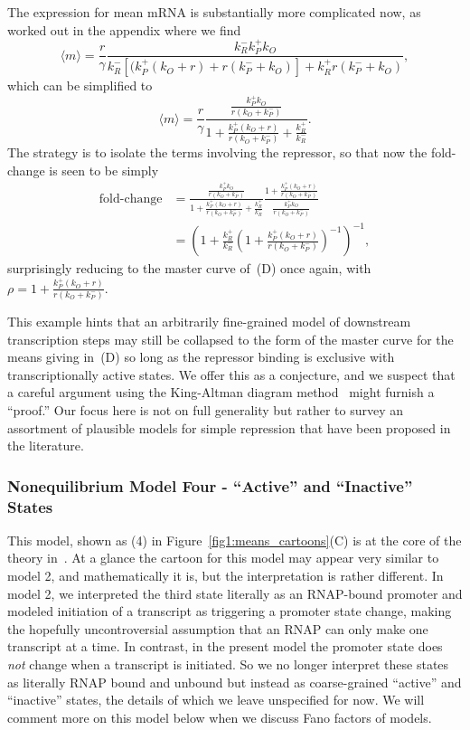 The expression for mean mRNA is substantially more complicated now, as worked
out in the appendix  where we find
\begin{equation}
\langle m\rangle = \frac{r}{\gamma}
        \frac{k_R^- k_P^+ k_O}
        {k_R^- [(k_P^+ (k_O + r) + r(k_P^- + k_O)] + k_R^+ r(k_P^- + k_O)},
\end{equation}
which can be simplified to
\begin{equation}
\langle m\rangle
= \frac{r}{\gamma}
\frac{\frac{k_P^+ k_O}{r(k_O + k_P^-)}}
        {1 + \frac{k_P^+ (k_O + r)}{r(k_O + k_P^-)} + \frac{k_R^+}{k_R^-}}.
\end{equation}
The strategy is to isolate the terms involving the repressor, so that now the
fold-change is seen to be simply
\begin{align}
\text{fold-change}
&= \frac{\frac{k_P^+ k_O}{r(k_O + k_P^-)}}
        {1 + \frac{k_P^+ (k_O + r)}{r(k_O + k_P^-)} + \frac{k_R^+}{k_R^-}}
        \frac{1 + \frac{k_P^+ (k_O + r)}{r(k_O + k_P^-)}}
                {\frac{k_P^+ k_O}{r(k_O + k_P^-)}}
\\
&= \left(
        1 + \frac{k_R^+}{k_R^-}
        \left(1 + \frac{k_P^+ (k_O + r)}{r(k_O + k_P^-)}\right)^{-1}
\right)^{-1},
\end{align}
surprisingly reducing to the master curve of~(D) once
again, with $\rho = 1 + \frac{k_P^+ (k_O + r)}{r(k_O + k_P^-)}$.

This example hints that an arbitrarily fine-grained model of downstream
transcription steps may still be collapsed to the form of the master curve for
the means giving in~(D) so long as the repressor
binding is exclusive with transcriptionally active states. We offer this as a
conjecture, and we suspect that a careful argument using the King-Altman diagram
method~\cite{King1956, Hill1966} might furnish a ``proof.'' Our focus here is
not on full generality but rather to survey an assortment of plausible models
for simple repression  that have been proposed in the literature.

\subsubsection{Nonequilibrium Model Four - ``Active'' and ``Inactive'' States}
This model, shown as (4) in Figure~\ref{fig1:means_cartoons}(C) is at the core
of the theory in~\cite{Razo-Mejia2020}. At a glance the cartoon for this model
may appear very similar to model 2, and mathematically it is, but the
interpretation is rather different. In model 2, we interpreted the third state
literally as an RNAP-bound promoter and modeled initiation of a transcript as
triggering a promoter state change, making the hopefully uncontroversial
assumption that an RNAP can only make one transcript at a time. In contrast, in
the present model the promoter state does \textit{not} change when a transcript
is initiated. So we no longer interpret these states as literally RNAP bound and
unbound but instead as coarse-grained ``active'' and ``inactive'' states, the
details of which we leave unspecified for now. We will comment more on this
model below when we discuss Fano factors of models.

